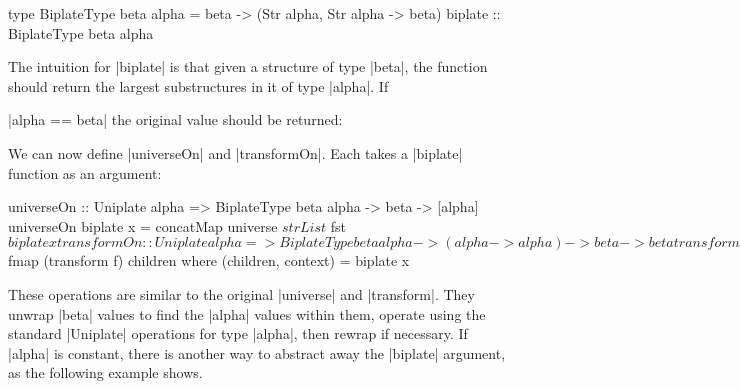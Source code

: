 \begin{comment}
\ignore\begin{code}
type BiplateType beta alpha = beta -> (Str alpha, Str alpha -> beta)
\end{code}
\end{comment}

\begin{code}
type BiplateType beta alpha = beta -> (Str alpha, Str alpha -> beta)
biplate :: BiplateType beta alpha
\end{code}

The intuition for |biplate| is that given a structure of type |beta|, the function should return the largest substructures in it of type |alpha|. If \ignore|alpha == beta| the original value should be returned:



We can now define |universeOn| and |transformOn|. Each takes a |biplate| function as an argument:

\begin{code}
universeOn :: Uniplate alpha => BiplateType beta alpha -> beta -> [alpha]
universeOn biplate x = concatMap universe $ strList $ fst $ biplate x

transformOn  ::  Uniplate alpha => BiplateType beta alpha -> (alpha -> alpha) -> beta -> beta
transformOn biplate f x = context $ fmap (transform f) children
    where (children, context) = biplate x
\end{code}

These operations are similar to the original |universe| and |transform|. They unwrap |beta| values to find the |alpha| values within them, operate using the standard |Uniplate| operations for type |alpha|, then rewrap if necessary. If |alpha| is constant, there is another way to abstract away the |biplate| argument, as the following example shows.

